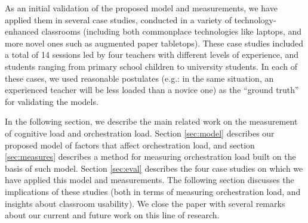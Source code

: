 \documentclass[10pt,journal,compsoc]{IEEEtran}
\begin{document}
As an initial validation of the proposed model and measurements, we have applied them in several case studies, conducted in a variety of technology-enhanced classrooms (including both commonplace technologies like laptops, and more novel ones such as augmented paper tabletops). These case studies included a total of 14 sessions led by four teachers with different levels of experience, and students ranging from primary school children to university students. In each of these cases, we used reasonable postulates (e.g.: in the same situation, an experienced teacher will be less loaded than a novice one) as the ``ground truth'' for validating the models.

In the following section, we describe the main related work on the measurement of cognitive load and orchestration load. Section \ref{sec:model} describes our proposed model of factors that affect orchestration load, and section \ref{sec:measures} describes a method for measuring orchestration load built on the basis of such model. Section \ref{sec:eval} describes the four case studies on which we have applied this model and measurements. The following section discusses the implications of these studies (both in terms of measuring orchestration load, and insights about classroom usability). We close the paper with several remarks about our current and future work on this line of research.
\end{document}
